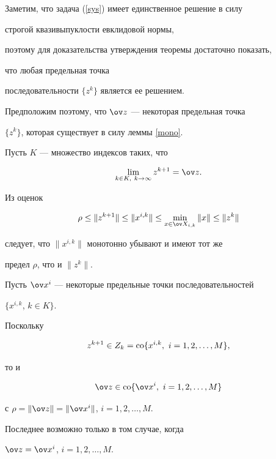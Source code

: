 \begin{pf}


Заметим, что задача (\ref{sys}) имеет единственное решение в силу


строгой квазивыпуклости евклидовой нормы,


поэтому для доказательства утверждения теоремы достаточно показать, 


что любая предельная точка


последовательности $\{z^k\}$ является ее решением.





Предположим поэтому, что $\ov z$ --- некоторая предельная точка


$\{z^k\}$, которая существует в силу леммы \ref{mono}.


Пусть $K$ --- множество индексов таких, что 


$$


\lim_{k\in K,\ k\to\infty} z^{k+1} = \ov z.


$$


Из оценок


$$


\rho \leq \|z^{k+1}\| \leq \| x^{i,k} \| \leq


\min_{x \in \ov X_{i,k} } \|x\| \leq \| z^k \|


$$


следует, что $ \| x^{i,k} \| $ монотонно убывают и имеют тот же


предел $\rho$, что и $\|z^{k}\| $.





Пусть $\ov x^i $ --- некоторые предельные точки последовательностей


$\lbrace x^{i,k}$, $k \in K \rbrace$.


Поскольку


$$


z^{k+1} \in Z_k = \co \{ x^{i,k},\ i = 1,2, \dotsc, M \},


$$


то и


$$


\ov z \in \co \{ \ov x^i,\ i = 1,2, \dotsc, M \}


$$


с $ \rho = \|\ov z \| =  \| \ov x^i \|$, $i = 1, 2, \dotsc, M$.


Последнее возможно только в том случае, когда


$\ov z =  \ov x^i$, $i = 1, 2, \dotsc, M$.






\end{pf}
